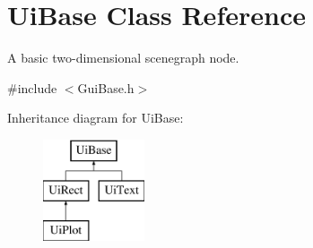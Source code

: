\hypertarget{class_ui_base}{\section{Ui\-Base Class Reference}
\label{class_ui_base}
}


A basic two-\/dimensional scenegraph node.  




{\ttfamily \#include $<$Gui\-Base.\-h$>$}

Inheritance diagram for Ui\-Base\-:\begin{figure}[H]
\begin{center}
\leavevmode
\includegraphics[height=3.000000cm]{class_ui_base}
\end{center}
\end{figure}

